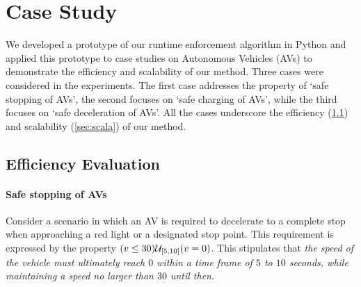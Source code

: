 \section{Case Study}
\label{Case Study}
We developed a prototype of our runtime enforcement algorithm in Python and applied this prototype to case studies on Autonomous Vehicles (AVs) to demonstrate the efficiency and scalability of our method. Three cases were considered in the experiments. The first case addresses the property of `safe stopping of AVs', the second focuses on `safe charging of AVs', while the third focuses on `safe deceleration of AVs'. All the cases underscore the efficiency (\cref{sec:efficiency}) and scalability (\cref{sec:scala}) of our method.



\subsection{Efficiency Evaluation}\label{sec:efficiency}

    \paragraph{Safe stopping of AVs}
    Consider a scenario in which an AV is required to decelerate to a complete stop when approaching a red light or a designated stop point. This requirement is expressed by the property \((v \le 30)\until_{[5,10]} (v=0)\). This stipulates that \textit{the speed of the vehicle must ultimately reach $0$ within a time frame of $5$ to $10$ seconds, while maintaining a speed no larger than $30$ until then}.

